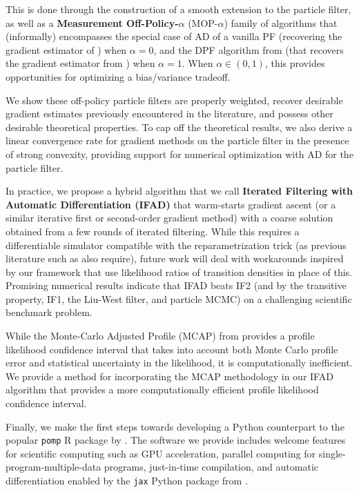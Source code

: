 \documentclass{article}
\begin{document}
This is done through the construction of a smooth extension to the particle filter, as well as a \textbf{Measurement Off-Policy-$\alpha$} (MOP-$\alpha$) family of algorithms that (informally) encompasses the special case of AD of a vanilla PF (recovering the gradient estimator of \citet{blei2018vsmc}) when $\alpha=0$, and the DPF algorithm from \citet{scibior2021dpf} (that recovers the gradient estimator from \citet{doucet2011sf}) when $\alpha=1$. When $\alpha \in (0,1)$, this provides opportunities for optimizing a bias/variance tradeoff. 

We show these off-policy particle filters are properly weighted, recover desirable gradient estimates previously encountered in the literature, and possess other desirable theoretical properties. To cap off the theoretical results, we also derive a linear convergence rate for gradient methods on the particle filter in the presence of strong convexity, providing support for numerical optimization with AD for the particle filter.

In practice, we propose a hybrid algorithm that we call \textbf{Iterated Filtering with Automatic Differentiation (IFAD)} that warm-starts gradient ascent (or a similar iterative first or second-order gradient method) with a coarse solution obtained from a few rounds of iterated filtering. While this requires a differentiable simulator compatible with the reparametrization trick (as previous literature such as \citet{corenflos2021ot} also require), future work will deal with workarounds inspired by our framework that use likelihood ratios of transition densities in place of this. Promising numerical results indicate that IFAD beats IF2 (and by the transitive property, IF1, the Liu-West filter, and particle MCMC) on a challenging scientific benchmark problem.

While the Monte-Carlo Adjusted Profile (MCAP) from \citet{Ionides_mcap} provides a profile likelihood confidence interval that takes into account both Monte Carlo profile error and statistical uncertainty in the likelihood, it is computationally inefficient.  We provide a method for incorporating the MCAP methodology in our IFAD algorithm that provides a more computationally efficient profile likelihood confidence interval. 

Finally, we make the first steps towards developing a Python counterpart to the popular \texttt{pomp} R package by \citet{king2016pomp, king2017pompmanual}. The software we provide includes welcome features for scientific computing such as GPU acceleration, parallel computing for single-program-multiple-data programs, just-in-time compilation, and automatic differentiation enabled by the \texttt{jax} Python package from \citet{jax2018github}. 
\end{document}
